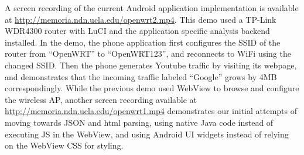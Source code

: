 A screen recording of the current Android application implementation is available at \url{http://memoria.ndn.ucla.edu/openwrt2.mp4}. This demo used a TP-Link WDR4300 router with LuCI and the application specific analysis backend installed. In the demo, the phone application first configures the SSID of the router from ``OpenWRT'' to ``OpenWRT123'', and reconnects to WiFi using the changed SSID. Then the phone generates Youtube traffic by visiting its webpage, and demonstrates that the incoming traffic labeled ``Google'' grows by 4MB correspondingly. While the previous demo used WebView to browse and configure the wireless AP, another screen recording available at \url{http://memoria.ndn.ucla.edu/openwrt1.mp4} demonstrates our initial attempts of moving towards JSON and html parsing, using native Java code instead of executing JS in the WebView, and using Android UI widgets instead of relying on the WebView CSS for styling.